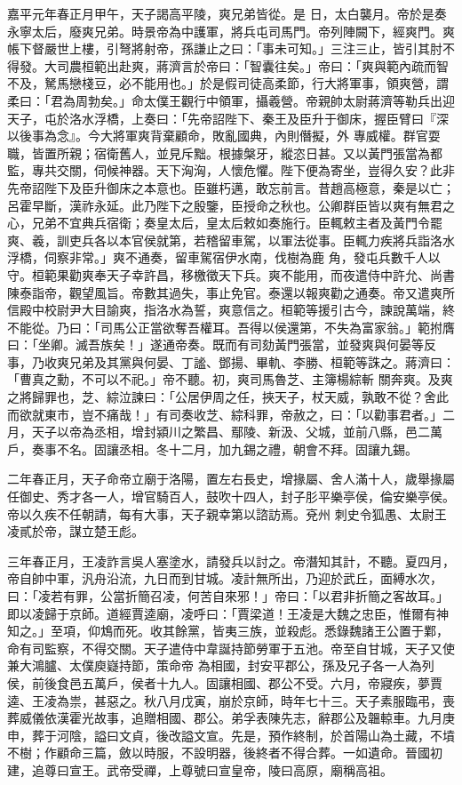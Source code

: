\begin{pinyinscope}
 嘉平元年春正月甲午，天子謁高平陵，爽兄弟皆從。是
 日，太白襲月。帝於是奏永寧太后，廢爽兄弟。時景帝為中護軍，將兵屯司馬門。帝列陣闕下，經爽門。爽帳下督嚴世上樓，引弩將射帝，孫謙止之曰：「事未可知。」三注三止，皆引其肘不得發。大司農桓範出赴爽，蔣濟言於帝曰：「智囊往矣。」帝曰：「爽與範內疏而智不及，駑馬戀棧豆，必不能用也。」於是假司徒高柔節，行大將軍事，領爽營，謂柔曰：「君為周勃矣。」命太僕王觀行中領軍，攝羲營。帝親帥太尉蔣濟等勒兵出迎天子，屯於洛水浮橋，上奏曰：「先帝詔陛下、秦王及臣升于御床，握臣臂曰『深以後事為念』。今大將軍爽背棄顧命，敗亂國典，內則僭擬，外
 專威權。群官耍職，皆置所親；宿衛舊人，並見斥黜。根據槃牙，縱恣日甚。又以黃門張當為都監，專共交關，伺候神器。天下洶洶，人懷危懼。陛下便為寄坐，豈得久安？此非先帝詔陛下及臣升御床之本意也。臣雖朽邁，敢忘前言。昔趙高極意，秦是以亡；呂霍早斷，漢祚永延。此乃陛下之殷鑒，臣授命之秋也。公卿群臣皆以爽有無君之心，兄弟不宜典兵宿衛；奏皇太后，皇太后敕如奏施行。臣輒敕主者及黃門令罷爽、羲，訓吏兵各以本官侯就第，若稽留車駕，以軍法從事。臣輒力疾將兵詣洛水浮橋，伺察非常。」爽不通奏，留車駕宿伊水南，伐樹為鹿
 角，發屯兵數千人以守。桓範果勸爽奉天子幸許昌，移檄徵天下兵。爽不能用，而夜遣侍中許允、尚書陳泰詣帝，觀望風旨。帝數其過失，事止免官。泰還以報爽勸之通奏。帝又遣爽所信殿中校尉尹大目諭爽，指洛水為誓，爽意信之。桓範等援引古今，諫說萬端，終不能從。乃曰：「司馬公正當欲奪吾權耳。吾得以侯還第，不失為富家翁。」範拊膺曰：「坐卿。滅吾族矣！」遂通帝奏。既而有司劾黃門張當，並發爽與何晏等反事，乃收爽兄弟及其黨與何晏、丁謐、鄧揚、畢軌、李勝、桓範等誅之。蔣濟曰：「曹真之勳，不可以不祀。」帝不聽。初，爽司馬魯芝、主簿楊綜斬
 關奔爽。及爽之將歸罪也，芝、綜泣諫曰：「公居伊周之任，挾天子，杖天威，孰敢不從？舍此而欲就東市，豈不痛哉！」有司奏收芝、綜科罪，帝赦之，曰：「以勸事君者。」二月，天子以帝為丞相，增封潁川之繁昌、鄢陵、新汲、父城，並前八縣，邑二萬戶，奏事不名。固讓丞相。冬十二月，加九錫之禮，朝會不拜。固讓九錫。



 二年春正月，天子命帝立廟于洛陽，置左右長史，增掾屬、舍人滿十人，歲舉掾屬任御史、秀才各一人，增官騎百人，鼓吹十四人，封子肜平樂亭侯，倫安樂亭侯。帝以久疾不任朝請，每有大事，天子親幸第以諮訪焉。兗州
 刺史令狐愚、太尉王凌貳於帝，謀立楚王彪。



 三年春正月，王凌詐言吳人塞塗水，請發兵以討之。帝潛知其計，不聽。夏四月，帝自帥中軍，汎舟沿流，九日而到甘城。凌計無所出，乃迎於武丘，面縛水次，曰：「凌若有罪，公當折簡召凌，何苦自來邪！」帝曰：「以君非折簡之客故耳。」即以凌歸于京師。道經賈逵廟，凌呼曰：「賈梁道！王凌是大魏之忠臣，惟爾有神知之。」至項，仰鴆而死。收其餘黨，皆夷三族，並殺彪。悉錄魏諸王公置于鄴，命有司監察，不得交關。天子遣侍中韋誕持節勞軍于五池。帝至自甘城，天子又使兼大鴻臚、太僕庾嶷持節，策命帝
 為相國，封安平郡公，孫及兄子各一人為列侯，前後食邑五萬戶，侯者十九人。固讓相國、郡公不受。六月，帝寢疾，夢賈逵、王凌為祟，甚惡之。秋八月戊寅，崩於京師，時年七十三。天子素服臨弔，喪葬威儀依漢霍光故事，追贈相國、郡公。弟孚表陳先志，辭郡公及韞輬車。九月庚申，葬于河陰，謚曰文貞，後改謚文宣。先是，預作終制，於首陽山為土藏，不墳不樹；作顧命三篇，斂以時服，不設明器，後終者不得合葬。一如遺命。晉國初建，追尊曰宣王。武帝受禪，上尊號曰宣皇帝，陵曰高原，廟稱高祖。




\end{pinyinscope}
